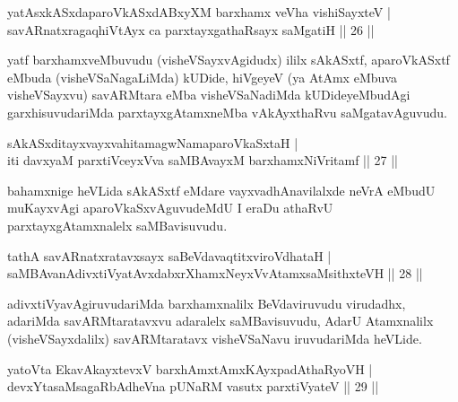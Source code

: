 
\begin{shl}
yatAsxkASxdaparoVkASxdABxyXM barxhamx veVha vishiSayxteV |\\
savARnatxragaqhiVtAyx ca parxtayxgathaRsayx saMgatiH \hfill || 26 ||
\end{shl}

\begin{artha}
yatf barxhamxveMbuvudu (visheVSayxvAgidudx) ililx sAkASxtf, aparoVkASxtf  eMbuda (visheVSaNagaLiMda) kUDide, hiVgeyeV
(ya AtAmx eMbuva visheVSayxvu) savARMtara eMba visheVSaNadiMda kUDideyeMbudAgi garxhisuvudariMda parxtayxgAtamxneMba vAkAyxthaRvu saMgatavAguvudu. 
\end{artha}


\begin{shl}
sAkASxditayxvayxvahitamagwNamaparoVkaSxtaH |\\
iti davxyaM parxtiVceyxVva saMBAvayxM barxhamxNiVritamf \hfill || 27 ||
\end{shl}

\begin{artha}
bahamxnige heVLida sAkASxtf eMdare vayxvadhAnavilalxde neVrA eMbudU muKayxvAgi aparoVkaSxvAguvudeMdU I eraDu athaRvU parxtayxgAtamxnalelx saMBavisuvudu.
\end{artha}%

\begin{shl}
tathA savARnatxratavxsayx saBeVdavaqtitxviroVdhataH |\\
saMBAvanA\s divxtiVyatAvxdabxrXhamxNeyxVvA\s \s tamxsaMsithxteVH \hfill || 28 ||
\end{shl}

\begin{artha}
adivxtiVyavAgiruvudariMda barxhamxnalilx BeVdaviruvudu virudadhx, adariMda savARMtaratavxvu adaralelx saMBavisuvudu, AdarU Atamxnalilx (visheVSayxdalilx) savARMtaratavx visheVSaNavu iruvudariMda heVLide.
\end{artha}


\begin{shl}
yatoV\s ta EkavAkayxtevxV barxhAmxtAmxKAyxpadAthaRyoVH |\\
devxYtasaMsagaRbAdheVna pUNaRM vasutx parxtiVyateV \hfill || 29 ||
\end{shl}

